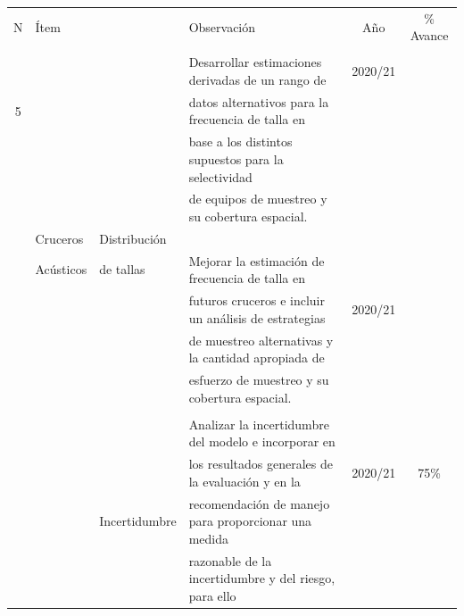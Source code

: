 \documentclass[
  spanish,
]{article}
\begin{document}
\begin{table}[h]
  \centering
  \resizebox{16cm}{!} {
  \begin{tabular}{|c|l|l|l|c|c|}
  \hline
  N  &  Ítem           &                      &   Observación                                         & Año     &   \% Avance \\ 
     &               &                      &                                                       &         & \\ \hline
     &               &                      & Desarrollar estimaciones derivadas de un rango de     & 2020/21 & \\ 
  5  &               &                      & datos alternativos para la frecuencia de talla en     &         & \\
     &               &                      & base a los distintos supuestos para la selectividad   &         & \\
     &               &                      & de equipos de muestreo y su cobertura espacial.       &         & \\ 
     & Cruceros      &  Distribución        &                                                       &         & \\
     & Acústicos     &  de tallas           & Mejorar la estimación de frecuencia de talla en       &         & \\ 
     &               &                      & futuros cruceros e incluir un análisis de estrategias & 2020/21 & \\
     &               &                      & de muestreo alternativas y la cantidad apropiada de   &         & \\
     &               &                      & esfuerzo de muestreo y su cobertura espacial.         &         & \\ \hline
     &               &                      &                                                       &         & \\
     &               &                      & Analizar la incertidumbre del modelo e incorporar en  &         & \\
     &               &                      & los resultados generales de la evaluación y en la     & 2020/21 & 75\% \\ 
     &               & Incertidumbre        & recomendación de manejo para proporcionar una medida  &         & \\
     &               &                      & razonable de la incertidumbre y del riesgo, para ello &         & \\

\end{tabular}}
\end{table}
\end{document}
